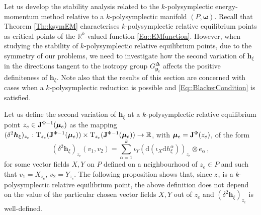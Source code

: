 \documentclass[11pt]{article}
\theoremstyle{plain}
\theoremstyle{definition}
\newcommand{\R}{\mathbb{R}}
\newcommand{\T}{\mathrm{T}}
\renewcommand{\d}{\mathrm{d}}
\newcommand*{\inn}[1]{\iota_{#1}}
\def\d{\mathrm{d}}
\numberwithin{equation}{section}
\begin{document}
Let us develop the stability analysis related to the $k$-polysymplectic energy-momentum method relative to a $k$-polysymplectic manifold $(P,\boldsymbol{\omega})$. Recall that Theorem \ref{Th::ksymEM} characterises $k$-polysymplectic relative equilibrium points as critical points of the $\R^k$-valued function \eqref{Eq::EMfunction}. However, when studying the stability of $k$-polysymplectic relative equilibrium points, due to the symmetry of our problems, %
we need to investigate how the second variation of $\boldsymbol{h}_{\xi}$ in the directions tangent to the isotropy group $G^{\boldsymbol{\Delta}}_{\boldsymbol{\mu}_e}$ affects the positive definiteness of $\boldsymbol{h}_\xi$. Note also that the results of this section are concerned with cases when a $k$-polysymplectic reduction is possible and \eqref{Eq::BlackerCondition} is satisfied.

 Let us define the second variation of $\boldsymbol{h}_{\xi}$ at a $k$-polysymplectic relative equilibrium point $z_e\in {\bf J}^{\Phi-1}({\bm \mu}_e)$ as the mapping
$(\delta^2 {\bm h}_\xi)_{z_e}: \T_{z_e}({\bf J}^{\Phi-1}(\bm \mu_e))\times \T_{z_e}({\bf J}^{\Phi-1}(\bm \mu_e))\rightarrow \mathbb{R}$, with $\bm\mu_e={\bf J}^{\Phi}(z_e)$, of the form
\begin{equation}
\label{Eq::SecVarf}
\left(\delta^2 \boldsymbol{h}_\xi\right)_{z_e}(v_1,v_2)=\sum^k_{\alpha=1}\inn{Y}\left(\d\left(\inn{X}\d h^\alpha_\xi\right)\right)_{z_e}\otimes e_\alpha\,,
\end{equation}
for some vector fields $X,Y$ on $P$ defined on a neighbourhood of $z_e\in P$ and such that $v_1=X_{z_e}$, $v_2=Y_{z_e}$. The following proposition shows that, since $z_e$ is a $k$-polysymplectic relative equilibrium point, the above definition does not depend on the value of the particular chosen vector fields $X, Y$ out of $z_e$ and $(\delta^2\boldsymbol{h}_\xi)_{z_e}$ is well-defined.
\end{document}
